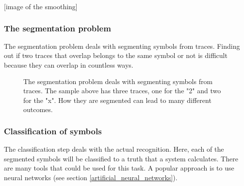 [image of the smoothing]

\subsubsection{The segmentation problem} \label{the_segmentation_problem}

The segmentation problem deals with segmenting symbols from traces. Finding out if two traces that overlap belongs to the same symbol or not is difficult because they can overlap in countless ways.

\begin{figure}[H]
\centering
{}
\caption{The segmentation problem deals with segmenting symbols from traces. The sample above has three traces, one for the "2"  and two for the "x". How they are segmented can lead to many different outcomes.}
\label{fig:segmentation}
\end{figure}

\subsubsection{Classification of symbols}
The classification step deals with the actual recognition. Here, each of the segmented symbols will be classified to a truth that a system calculates. There are many tools that could be used for this task. A popular approach is to use neural networks (see section \ref{artificial_neural_networks}).

